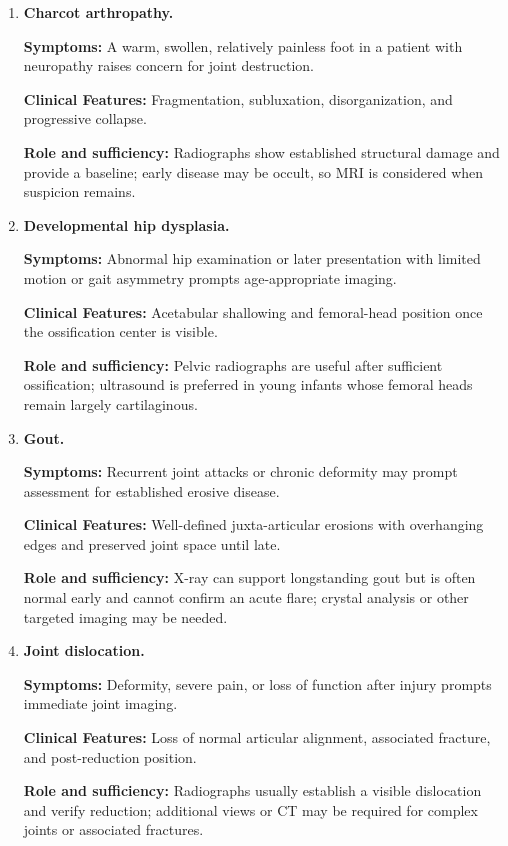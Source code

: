 \begin{enumerate}[leftmargin=*,itemsep=0.45em,topsep=0.4em]
\item \textbf{Charcot arthropathy.}\par\noindent\textbf{Symptoms:} A warm, swollen, relatively painless foot in a patient with neuropathy raises concern for joint destruction.\par\noindent\textbf{Clinical Features:} Fragmentation, subluxation, disorganization, and progressive collapse.\par\noindent\textbf{Role and sufficiency:} Radiographs show established structural damage and provide a baseline; early disease may be occult, so MRI is considered when suspicion remains.
\item \textbf{Developmental hip dysplasia.}\par\noindent\textbf{Symptoms:} Abnormal hip examination or later presentation with limited motion or gait asymmetry prompts age-appropriate imaging.\par\noindent\textbf{Clinical Features:} Acetabular shallowing and femoral-head position once the ossification center is visible.\par\noindent\textbf{Role and sufficiency:} Pelvic radiographs are useful after sufficient ossification; ultrasound is preferred in young infants whose femoral heads remain largely cartilaginous.
\item \textbf{Gout.}\par\noindent\textbf{Symptoms:} Recurrent joint attacks or chronic deformity may prompt assessment for established erosive disease.\par\noindent\textbf{Clinical Features:} Well-defined juxta-articular erosions with overhanging edges and preserved joint space until late.\par\noindent\textbf{Role and sufficiency:} X-ray can support longstanding gout but is often normal early and cannot confirm an acute flare; crystal analysis or other targeted imaging may be needed.
\item \textbf{Joint dislocation.}\par\noindent\textbf{Symptoms:} Deformity, severe pain, or loss of function after injury prompts immediate joint imaging.\par\noindent\textbf{Clinical Features:} Loss of normal articular alignment, associated fracture, and post-reduction position.\par\noindent\textbf{Role and sufficiency:} Radiographs usually establish a visible dislocation and verify reduction; additional views or CT may be required for complex joints or associated fractures.

\end{enumerate}
